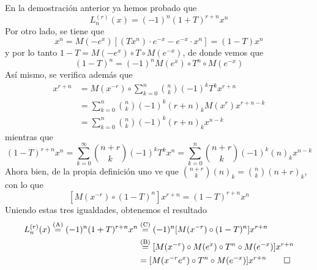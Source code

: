 \begin{demo}
    En la demostración anterior ya hemos probado que 
    \begin{equation}\tag{A}
        L_n^{(r)}(x) = (-1)^n (1+T)^{r+n} x^n
    \end{equation}
    Por otro lado, se tiene que
    \begin{equation*}
        [M(-e^x) \circ T \circ M(e^{-x})] x^n = M(-e^x)[(Tx^{n}) \cdot e^{-x}-e^{-x} \cdot x^n] = (1 - T) x^n
    \end{equation*}
    y por lo tanto $1 - T = M(-e^x) \circ T \circ M(e^{-x})$, de donde vemos que
    \begin{equation}\tag{B}
        (1-T)^n = (-1)^n M(e^x) \circ T^n \circ M(e^{-x})
    \end{equation}
    Así mismo, se verifica además que
    \begin{align*}
        [M(x^{-r}) \circ (1-T)^n] x^{r+n} & = M(x^{-r}) \circ \sum_{k=0}^n \binom{n}{k} (-1)^k T^k x^{r+n} \\
        & = \sum_{k=0}^n \binom{n}{k} (-1)^k (r+n)_k M(x^r)x^{r+n-k}\\ 
        & = \sum_{k=0}^n \binom{n}{k} (-1)^k (r+n)_k x^{n-k}
    \end{align*}
    mientras que
    \begin{equation*}
        (1-T)^{r+n} x^n = \sum_{k=0}^\infty \binom{n+r}{k}(-1)^k T^k x^n = \sum_{k=0}^n \binom{n+r}{k}(-1)^k (n)_k x^{n-k}
    \end{equation*}
    Ahora bien, de la propia definición uno ve que $\binom{n+r}{k} (n)_k = \binom{n}{k} (n+r)_k$, con lo que
    \begin{equation}\tag{C}
        [M(x^{-r}) \circ (1-T)^n] x^{r+n} = (1-T)^{r+n} x^n 
    \end{equation}
    Uniendo estas tres igualdades, obtenemos el resultado
    \begin{align*}
        L_n^{(r)}(x) \stackrel{\textnormal{(A)}}{=} (-1)^n (1+T)^{r+n} x^n & \stackrel{\textnormal{(C)}}{=} (-1)^n [M(x^{-r}) \circ (1-T)^n] x^{r+n} \\
        & \stackrel{\textnormal{(B)}}{=} [M(x^{-r}) \circ M(e^x) \circ T^n \circ M(e^{-x})] x^{r+n} \\
        & = [M(x^{-r}e^x) \circ T^n \circ M(e^{-x})] x^{r+n} \qedhere
    \end{align*}
\end{demo}


